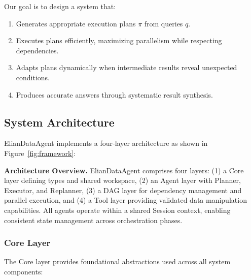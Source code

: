 \documentclass{article}
\theoremstyle{definition}
\begin{document}
Our goal is to design a system that:
\begin{enumerate}[leftmargin=1.5em]
    \item Generates appropriate execution plans $\pi$ from queries $q$.
    \item Executes plans efficiently, maximizing parallelism while respecting dependencies.
    \item Adapts plans dynamically when intermediate results reveal unexpected conditions.
    \item Produces accurate answers through systematic result synthesis.
\end{enumerate}

\subsection{System Architecture}

ElianDataAgent implements a four-layer architecture as shown in Figure~\ref{fig:framework}:

\begin{overviewbox}
\noindent\textbf{Architecture Overview.}
ElianDataAgent comprises four layers: (1) a Core layer defining types and shared workspace, (2) an Agent layer with Planner, Executor, and Replanner, (3) a DAG layer for dependency management and parallel execution, and (4) a Tool layer providing validated data manipulation capabilities. All agents operate within a shared Session context, enabling consistent state management across orchestration phases.
\end{overviewbox}

\subsubsection{Core Layer}

The Core layer provides foundational abstractions used across all system components:
\end{document}
